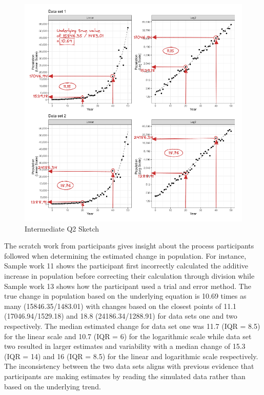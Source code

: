 \documentclass[print]{nuthesis}
\begin{document}
\begin{figure}[tbp]

{\centering \includegraphics[width=1\linewidth,]{images/03-estimation/qi2-sketch} 

}

\caption{Intermediate Q2 Sketch}\label{fig:qi2-sketch}
\end{figure}

The scratch work from participants gives insight about the process participants followed when determining the estimated change in population.
For instance, Sample work 11 shows the participant first incorrectly calculated the additive increase in population before correcting their calculation through division while Sample work 13 shows how the participant used a trial and error method.
The true change in population based on the underlying equation is 10.69 times as many (15846.35/1483.01) with changes based on the closest points of 11.1 (17046.94/1529.18) and 18.8 (24186.34/1288.91) for data sets one and two respectively.
The median estimated change for data set one was 11.7 (IQR = 8.5) for the linear scale and 10.7 (IQR = 6) for the logarithmic scale while data set two resulted in larger estimates and variability with a median change of 15.3 (IQR = 14) and 16 (IQR = 8.5) for the linear and logarithmic scale respectively.
The inconsistency between the two data sets aligns with previous evidence that participants are making estimates by reading the simulated data rather than based on the underlying trend.
\end{document}
